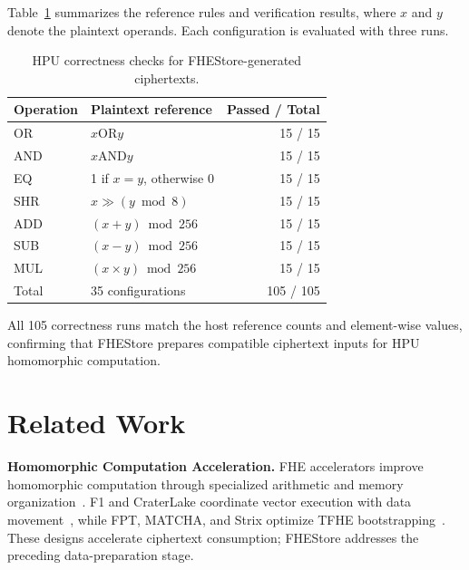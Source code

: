 \documentclass[sigconf,anonymous,balance=false]{acmart}
\newcommand{\bodypar}{\par\vskip 0pt plus 6pt\relax}
\begin{document}
Table~\ref{tab:hpu-correctness} summarizes the reference rules and verification results, where $x$ and $y$ denote the plaintext operands. Each configuration is evaluated with three runs.
\bodypar

\begin{table}[!htbp]
  \centering
  \caption{HPU correctness checks for FHEStore-generated ciphertexts.}
  \label{tab:hpu-correctness}
  \small
  \setlength{\tabcolsep}{3pt}
  \renewcommand{\arraystretch}{1.16}
  \begin{tabular*}{\columnwidth}{@{\extracolsep{\fill}}llr@{}}
    \toprule
    \textbf{Operation} & \textbf{Plaintext reference} & \textbf{Passed / Total} \\
    \midrule
    OR & $x\mathbin{\mathrm{OR}}y$ & 15 / 15 \\
    AND & $x\mathbin{\mathrm{AND}}y$ & 15 / 15 \\
    EQ & 1 if $x=y$, otherwise 0 & 15 / 15 \\
    SHR & $x \gg (y\bmod 8)$ & 15 / 15 \\
    ADD & $(x+y)\bmod 256$ & 15 / 15 \\
    SUB & $(x-y)\bmod 256$ & 15 / 15 \\
    MUL & $(x\times y)\bmod 256$ & 15 / 15 \\
    \midrule
    Total & 35 configurations & 105 / 105 \\
    \bottomrule
  \end{tabular*}
\end{table}

All 105 correctness runs match the host reference counts and element-wise values, confirming that FHEStore prepares compatible ciphertext inputs for HPU homomorphic computation.
\bodypar

\section{Related Work}
\label{sec:related}
\noindent\textbf{Homomorphic Computation Acceleration.}
FHE accelerators improve homomorphic computation through specialized arithmetic and memory organization~\cite{xu2026hera,zhou2023fhemem,kim2022bts,kim2022ark}. F1 and CraterLake coordinate vector execution with data movement~\cite{samardzic2021f1,samardzic2022craterlake}, while FPT, MATCHA, and Strix optimize TFHE bootstrapping~\cite{vanbeirendonck2023fpt,jiang2022matcha,putra2023strix}. These designs accelerate ciphertext consumption; FHEStore addresses the preceding data-preparation stage.
\bodypar
\end{document}
